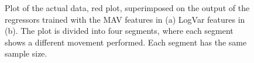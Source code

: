\begin{figure}[H]
	\centering
	\label{fig:SuperPositionTraining}
	\caption{Plot of the actual data, red plot, superimposed on the output of the regressors trained with the MAV features in (a) LogVar features in (b). The plot is divided into four segments, where each segment shows a different movement performed. Each segment has the same sample size.}
\end{figure}

